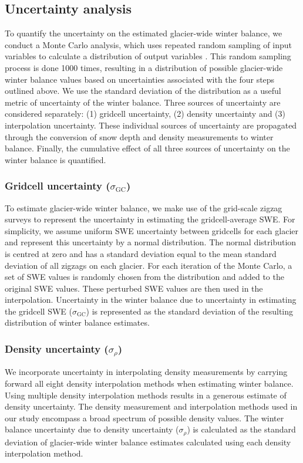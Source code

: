 \documentclass[twocolumn, letterpaper]{igs}
\begin{document}
\subsection{Uncertainty analysis}

To quantify the uncertainty on the estimated glacier-wide winter balance, we conduct a Monte Carlo analysis, which uses repeated random sampling of input variables to calculate a distribution of output variables \citep{Metropolis1949}. This random sampling process is done 1000 times, resulting in a distribution of possible glacier-wide winter balance values based on uncertainties associated with the four steps outlined above. We use the standard deviation of the distribution as a useful metric of uncertainty of the winter balance. Three sources of uncertainty are considered separately: (1) gridcell uncertainty, (2) density uncertainty and (3) interpolation uncertainty. These individual sources of uncertainty are propagated through the conversion of snow depth and density measurements to winter balance. Finally, the cumulative effect of all three sources of uncertainty on the winter balance is quantified.

	\subsubsection{Gridcell uncertainty ($\sigma_{\mathrm{GC}}$)}
To estimate glacier-wide winter balance, we make use of the grid-scale zigzag surveys to represent the uncertainty in estimating the gridcell-average SWE. For simplicity, we assume uniform SWE uncertainty between gridcells for each glacier and represent this uncertainty by a normal distribution. The normal distribution is centred at zero and has a standard deviation equal to the mean standard deviation of all zigzags on each glacier. For each iteration of the Monte Carlo, a set of SWE values is randomly chosen from the distribution and added to the original SWE values. These perturbed SWE values are then used in the interpolation. Uncertainty in the winter balance due to uncertainty in estimating the gridcell SWE ($\sigma_{\mathrm{GC}}$) is represented as the standard deviation of the resulting distribution of winter balance estimates.  

	\subsubsection{Density uncertainty ($\sigma_{\rho}$)}
We incorporate uncertainty in interpolating density measurements by carrying forward all eight density interpolation methods when estimating winter balance. Using multiple density interpolation methods results in a generous estimate of density uncertainty. The density measurement and interpolation methods used in our study encompass a broad spectrum of possible density values. The winter balance uncertainty due to density uncertainty ($\sigma_{\rho}$) is calculated as the standard deviation of glacier-wide winter balance estimates calculated using each density interpolation method.
\end{document}
